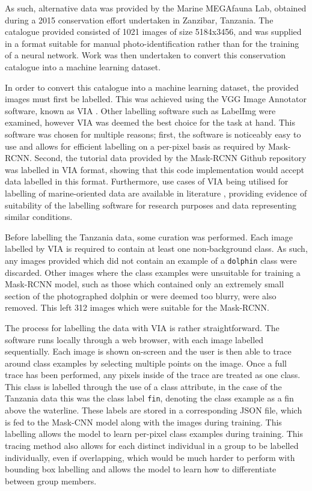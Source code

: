 As such, alternative data was provided by the Marine MEGAfauna Lab, obtained during a 2015 conservation effort undertaken in Zanzibar, Tanzania. The catalogue provided consisted of 1021 images of size 5184x3456, and was supplied in a format suitable for manual photo-identification rather than for the training of a neural network. Work was then undertaken to convert this conservation catalogue into a machine learning dataset. 

In order to convert this catalogue into a machine learning dataset, the provided images must first be labelled. This was achieved using the VGG Image Annotator software, known as VIA \cite{dutta_via_2019}. Other labelling software such as LabelImg \cite{tzutalin_labelimg_2021} were examined, however VIA was deemed the best choice for the task at hand. This software was chosen for multiple reasons; first, the software is noticeably easy to use and allows for efficient labelling on a per-pixel basis as required by Mask-RCNN. Second, the tutorial data provided by the Mask-RCNN Github repository was labelled in VIA format, showing that this code implementation would accept data labelled in this format. Furthermore, use cases of VIA being utilised for labelling of marine-oriented data are available in literature \cite{nita_cnn-based_2020}, providing evidence of suitability of the labelling software for research purposes and data representing similar conditions.

Before labelling the Tanzania data, some curation was performed. Each image labelled by VIA is required to contain at least one non-background class. As such, any images provided which did not contain an example of a \texttt{dolphin} class were discarded. Other images where the class examples were unsuitable for training a Mask-RCNN model, such as those which contained only an extremely small section of the photographed dolphin or were deemed too blurry, were also removed. This left 312 images which were suitable for the Mask-RCNN.

The process for labelling the data with VIA is rather straightforward. The software runs locally through a web browser, with each image labelled sequentially. Each image is shown on-screen and the user is then able to trace around class examples by selecting multiple points on the image. Once a full trace has been performed, any pixels inside of the trace are treated as one class. This class is labelled through the use of a class attribute, in the case of the Tanzania data this was the class label \texttt{fin}, denoting the class example as a fin above the waterline. These labels are stored in a corresponding JSON file, which is fed to the Mask-CNN model along with the images during training. This labelling allows the model to learn per-pixel class examples during training. This tracing method also allows for each distinct individual in a group to be labelled individually, even if overlapping, which would be much harder to perform with bounding box labelling and allows the model to learn how to differentiate between group members.  

